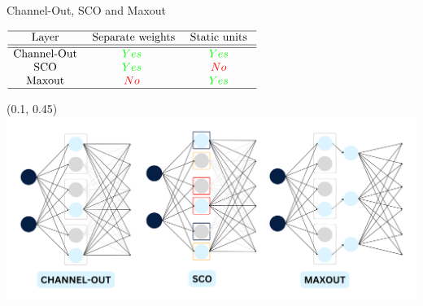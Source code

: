\documentclass[UKenglish]{beamer}
\begin{document}
\begin{frame}{Channel-Out, SCO and Maxout}
    \vspace{0.5cm}
    \center
        \begin{table}
            $
            \begin{array}{ccc}
                \hline \text { Layer } & \text { Separate weights} & \text { Static units }\\
                \hline\hline\text{Channel-Out} & \textcolor{green}{Yes} &  \textcolor{green}{Yes}  \\
                \text { SCO } &  \textcolor{green}{Yes} &  \textcolor{red}{No}  \\
                \text{ Maxout } &  \textcolor{red}{No} &  \textcolor{green}{Yes}   \\
                \hline
            \end{array}
            $
        \end{table}
    \begin{textblock}{0.8}(0.1, 0.45)
        \includegraphics[width = \textwidth]{figures/EnsembleComp}
    \end{textblock}
\end{frame}
\end{document}
